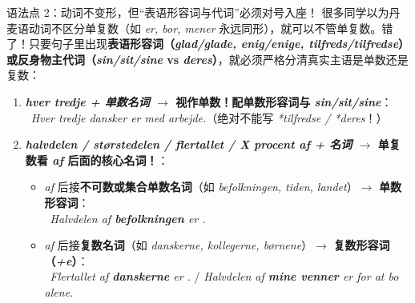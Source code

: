 \begin{grammatikbox}{语法点 2：动词不变形，但“表语形容词与代词”必须对号入座！}
很多同学以为丹麦语动词不区分单复数（如 \textit{er, bor, mener} 永远同形），就可以不管单复数。错了！只要句子里出现\textbf{表语形容词（\textit{glad/glade, enig/enige, tilfreds/tilfredse}）或反身物主代词（\textit{sin/sit/sine} vs \textit{deres}）}，就必须严格分清真实主语是单数还是复数：
\begin{enumerate}
  \item \textbf{\textit{hver tredje + 单数名词} $\rightarrow$ 视作单数！配单数形容词与 \textit{sin/sit/sine}}：\\
    \ \textit{Hver tredje dansker er  med  arbejde.}（绝对不能写 \textit{*tilfredse / *deres}！）
  \item \textbf{\textit{halvdelen / størstedelen / flertallet / X procent af + 名词} $\rightarrow$ 单复数看 \textit{af} 后面的核心名词！}：
    \begin{itemize}
      \item \textit{af} 后接\textbf{不可数或集合单数名词}（如 \textit{befolkningen, tiden, landet}）$\rightarrow$ \textbf{单数形容词}：\\
        \ \textit{Halvdelen af \textbf{befolkningen} er .}
      \item \textit{af} 后接\textbf{复数名词}（如 \textit{danskerne, kollegerne, børnene}）$\rightarrow$ \textbf{复数形容词（\textit{+e}）}：\\
        \ \textit{Flertallet af \textbf{danskerne} er .} / \textit{Halvdelen af \textbf{mine venner} er  for at bo alene.}
    \end{itemize}
\end{enumerate}


\end{grammatikbox}
